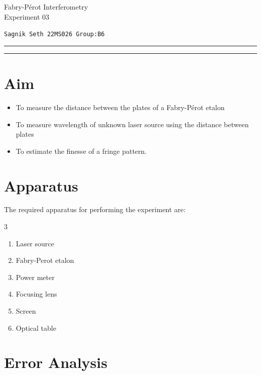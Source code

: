\documentclass[usenames, svgnames, dvipsnames]{scrartcl}
\begin{document}
        \begin{center}
            {\rmfamily
                \Large{\textcolor{blue!30!black}{%
                    \textmd{{\Large{{F}}}}abry-\textmd{{\Large{{P}}}}\'erot \textmd{{\Large{{I}}}}nterferometry  \\
                     {\Large Experiment} 03%
                }}\\[0.4cm]
            }
            \end{center}
        \begin{center}
           \large \texttt{{{\LARGE  S}agnik {\LARGE S}eth\hspace{0.3cm} 22MS026 \hspace{0.3cm} Group:B6}}
        \end{center}
\hrule
\vspace{0.08cm}
\hrule
\vspace{0.6cm}
\section{Aim}
\begin{itemize}
  \item To measure the distance between the plates of a Fabry-P\'erot etalon
  \item To measure wavelength of unknown laser source using the distance between plates
  \item To estimate the finesse of a fringe pattern.
\end{itemize}
\section{Apparatus}
The required apparatus for performing the experiment are:
\begin{multicols}{3}
\begin{enumerate}
  \item Laser source
  \item Fabry-Perot etalon 
  \item Power meter 
  \item Focusing lens
  \item Screen
  \item Optical table
\end{enumerate}
\end{multicols}



\section{Error Analysis}
\end{document}
